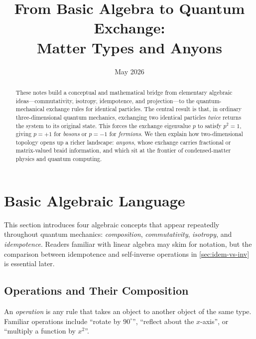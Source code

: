 \documentclass[11pt,a4paper]{article}
\title{%
  \color{themeblue}
  \LARGE\bfseries
  From Basic Algebra to Quantum Exchange:\\[0.3em]
  \large Matter Types and Anyons
}
\author{}
\date{May 2026}
\begin{document}
\maketitle
\thispagestyle{empty}

\begin{abstract}
\noindent
These notes build a conceptual and mathematical bridge from elementary algebraic
ideas---commutativity, isotropy, idempotence, and projection---to the
quantum-mechanical exchange rules for identical particles.  The central result
is that, in ordinary three-dimensional quantum mechanics, exchanging two
identical particles \emph{twice} returns the system to its original state.
This forces the exchange eigenvalue $p$ to satisfy $p^{2}=1$, giving $p=+1$
for \emph{bosons} or $p=-1$ for \emph{fermions}.  We then explain how
two-dimensional topology opens up a richer landscape: \emph{anyons}, whose
exchange carries fractional or matrix-valued braid information, and which sit
at the frontier of condensed-matter physics and quantum computing.
\end{abstract}

\vspace{1em}
\tableofcontents
\newpage

\section{Basic Algebraic Language}

This section introduces four algebraic concepts that appear repeatedly
throughout quantum mechanics: \emph{composition}, \emph{commutativity},
\emph{isotropy}, and \emph{idempotence}.  Readers familiar with linear algebra
may skim for notation, but the comparison between idempotence and self-inverse
operations in \cref{sec:idem-vs-inv} is essential later.

\subsection{Operations and Their Composition}

An \emph{operation} is any rule that takes an object to another object of the
same type.  Familiar operations include ``rotate by $90^\circ$'', ``reflect
about the $x$-axis'', or ``multiply a function by $x^2$''.
\end{document}
